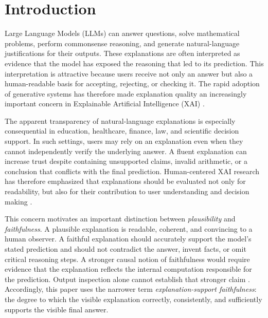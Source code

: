 \documentclass{article}
\begin{document}
\section{Introduction}

Large Language Models (LLMs) can answer questions, solve mathematical
problems, perform commonsense reasoning, and generate natural-language
justifications for their outputs. These explanations are often
interpreted as evidence that the model has exposed the reasoning that
led to its prediction. This interpretation is attractive because users
receive not only an answer but also a human-readable basis for
accepting, rejecting, or checking it. The rapid adoption of generative
systems has therefore made explanation quality an increasingly
important concern in Explainable Artificial Intelligence (XAI)
\cite{gunning2019darpa,chang2024survey,schneider2024genxai}.

The apparent transparency of natural-language explanations is
especially consequential in education, healthcare, finance, law, and
scientific decision support. In such settings, users may rely on an
explanation even when they cannot independently verify the underlying
answer. A fluent explanation can increase trust despite containing
unsupported claims, invalid arithmetic, or a conclusion that conflicts
with the final prediction. Human-centered XAI research has therefore
emphasized that explanations should be evaluated not only for
readability, but also for their contribution to user understanding and
decision making
\cite{miller2019explanation,brahman2022human,doshivelez2017rigorous}.

This concern motivates an important distinction between
\emph{plausibility} and \emph{faithfulness}. A plausible explanation is
readable, coherent, and convincing to a human observer. A faithful
explanation should accurately support the model's stated prediction and
should not contradict the answer, invent facts, or omit critical
reasoning steps. A stronger causal notion of faithfulness would require
evidence that the explanation reflects the internal computation
responsible for the prediction. Output inspection alone cannot establish
that stronger claim
\cite{turpin2023language,lanham2023measuring,parcalabescu2024measuring}.
Accordingly, this paper uses the narrower term
\emph{explanation-support faithfulness}: the degree to which the visible
explanation correctly, consistently, and sufficiently supports the
visible final answer.
\end{document}
